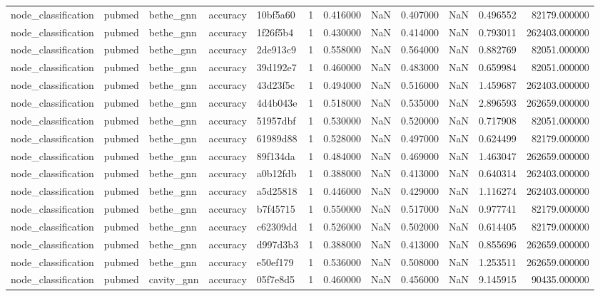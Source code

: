 \begin{tabular}{lllllrrrrrrr}
node_classification & pubmed & bethe_gnn & accuracy & 10bf5a60 & 1 & 0.416000 & NaN & 0.407000 & NaN & 0.496552 & 82179.000000 \\
node_classification & pubmed & bethe_gnn & accuracy & 1f26f5b4 & 1 & 0.430000 & NaN & 0.414000 & NaN & 0.793011 & 262403.000000 \\
node_classification & pubmed & bethe_gnn & accuracy & 2de913c9 & 1 & 0.558000 & NaN & 0.564000 & NaN & 0.882769 & 82051.000000 \\
node_classification & pubmed & bethe_gnn & accuracy & 39d192e7 & 1 & 0.460000 & NaN & 0.483000 & NaN & 0.659984 & 82051.000000 \\
node_classification & pubmed & bethe_gnn & accuracy & 43d23f5c & 1 & 0.494000 & NaN & 0.516000 & NaN & 1.459687 & 262403.000000 \\
node_classification & pubmed & bethe_gnn & accuracy & 4d4b043e & 1 & 0.518000 & NaN & 0.535000 & NaN & 2.896593 & 262659.000000 \\
node_classification & pubmed & bethe_gnn & accuracy & 51957dbf & 1 & 0.530000 & NaN & 0.520000 & NaN & 0.717908 & 82051.000000 \\
node_classification & pubmed & bethe_gnn & accuracy & 61989d88 & 1 & 0.528000 & NaN & 0.497000 & NaN & 0.624499 & 82179.000000 \\
node_classification & pubmed & bethe_gnn & accuracy & 89f134da & 1 & 0.484000 & NaN & 0.469000 & NaN & 1.463047 & 262659.000000 \\
node_classification & pubmed & bethe_gnn & accuracy & a0b12fdb & 1 & 0.388000 & NaN & 0.413000 & NaN & 0.640314 & 262403.000000 \\
node_classification & pubmed & bethe_gnn & accuracy & a5d25818 & 1 & 0.446000 & NaN & 0.429000 & NaN & 1.116274 & 262403.000000 \\
node_classification & pubmed & bethe_gnn & accuracy & b7f45715 & 1 & 0.550000 & NaN & 0.517000 & NaN & 0.977741 & 82179.000000 \\
node_classification & pubmed & bethe_gnn & accuracy & c62309dd & 1 & 0.526000 & NaN & 0.502000 & NaN & 0.614405 & 82179.000000 \\
node_classification & pubmed & bethe_gnn & accuracy & d997d3b3 & 1 & 0.388000 & NaN & 0.413000 & NaN & 0.855696 & 262659.000000 \\
node_classification & pubmed & bethe_gnn & accuracy & e50ef179 & 1 & 0.536000 & NaN & 0.508000 & NaN & 1.253511 & 262659.000000 \\
node_classification & pubmed & cavity_gnn & accuracy & 05f7e8d5 & 1 & 0.460000 & NaN & 0.456000 & NaN & 9.145915 & 90435.000000 \\

\end{tabular}

